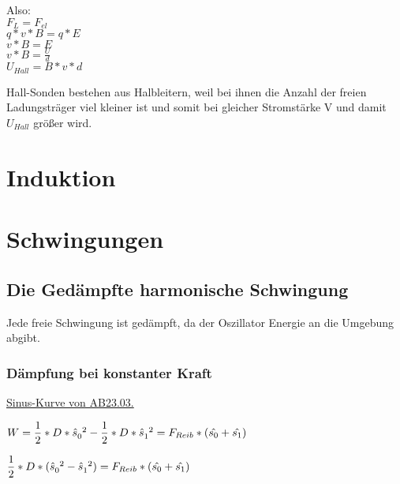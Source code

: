 \documentclass[12pt]{scrartcl}
\begin{document}
\begin{flushleft}
		Also: 
		\vspace{1mm} \\
		$F_L = F_{el}$
		\vspace{1mm} \\
		$ q \ast v \ast B = q \ast E $
		\vspace{1mm} \\
		$ v \ast B = E $
		\vspace{1mm} \\
		$ v \ast B = \frac{U}{d} $
		\vspace{1mm} \\
		$ U_{Hall} = B \ast v \ast d $
		\vspace{5mm} 
		
		Hall-Sonden bestehen aus Halbleitern, weil bei ihnen die Anzahl der freien Ladungsträger viel kleiner ist und somit bei gleicher Stromstärke V und damit $U_{Hall}$ größer wird.		
 	\section{Induktion}	
	\section{Schwingungen}
	\setcounter{subsection}{6}
		\subsection{Die Gedämpfte harmonische Schwingung}
		Jede freie Schwingung ist gedämpft, da der Oszillator Energie an die Umgebung abgibt. 
	
			\subsubsection{Dämpfung bei konstanter Kraft}
			\underline{Sinus-Kurve von AB23.03.}
	
			\vspace{5mm}
			$ W = \dfrac{1}{2} \ast D \ast \hat{s}_{0}^{\hspace{1.5mm} 2} - \dfrac{1}{2} \ast D \ast \hat{s}_{1}^{\hspace{1.5mm} 2} = F_{Reib} \ast (\hat{s_{0}} + \hat{s_{1}})$
	
			\vspace{2mm}
			\hspace{20mm} $ \dfrac{1}{2} \ast D \ast (\hat{s}_{0}^{\hspace{1.5mm} 2} - \hat{s}_{1}^{\hspace{1.5mm} 2}) = F_{Reib} \ast (\hat{s_{0}} + \hat{s_{1}})$
			

\end{flushleft}
\end{document}
